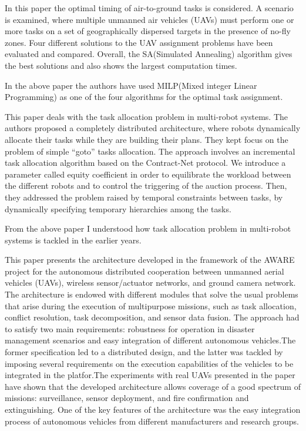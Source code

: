 \documentclass[conference]{IEEEtran}
\begin{document}
In this paper the optimal timing of air-to-ground tasks is considered. A scenario is examined, where multiple unmanned air vehicles (UAVs) must perform one or more tasks on a set of geographically dispersed targets in the presence of no-fly zones. Four different solutions to the UAV assignment problems have been evaluated and compared. Overall, the SA(Simulated Annealing) algorithm gives the best solutions and also shows the largest computation times\cite{leary2011constrained}.

In the above paper the authors have used MILP(Mixed integer Linear Programming) as one of the four algorithms for the optimal task assignment.

This paper deals with the task allocation problem in multi-robot systems. The authors proposed a completely distributed architecture, where robots dynamically allocate their tasks while they are building their plans. They kept focus on the problem of simple “goto” tasks allocation. The approach involves an incremental task allocation algorithm based on the Contract-Net protocol. We introduce a parameter called equity coefficient in order to equilibrate the workload between the different robots and to control the triggering of the auction process. Then, they addressed the problem raised by temporal constraints between tasks, by dynamically specifying temporary hierarchies among the tasks\cite{lemaire2004distributed}.

From the above paper I understood how task allocation problem in multi-robot systems is tackled in the earlier years.

This paper presents the architecture developed in the framework of the AWARE project for the autonomous distributed cooperation between unmanned aerial vehicles (UAVs), wireless sensor/actuator networks, and ground camera network. The architecture is endowed with different modules that solve the usual problems that arise during the execution of multipurpose missions, such as task allocation, conflict resolution, task decomposition, and sensor data fusion. The approach had to satisfy two main requirements: robustness for operation in disaster management scenarios and easy integration of different autonomous vehicles.The former specification led to a distributed design, and the latter was tackled by imposing several requirements on the execution capabilities of the vehicles to be integrated in the platfor.The experiments with real UAVs presented in the paper have shown that the developed architecture allows coverage of a good spectrum of missions: surveillance, sensor deployment, and fire confirmation and extinguishing. One of the key features of the architecture was the easy integration process of autonomous vehicles from different manufacturers and research groups\cite{maza2011distributed}.
\end{document}
